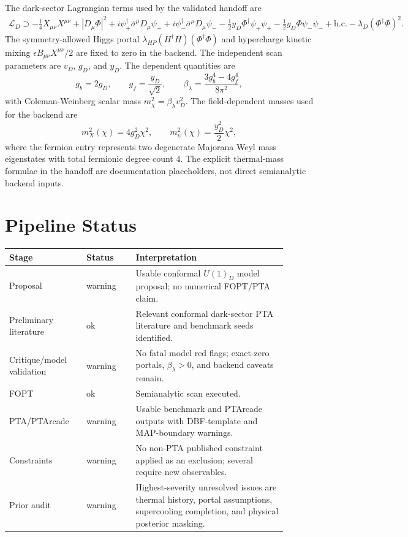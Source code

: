 \documentclass[11pt]{article}
\begin{document}
The dark-sector Lagrangian terms used by the validated handoff are
\begin{align}
\mathcal{L}_D \supset
-\frac14 X_{\mu\nu}X^{\mu\nu}
 + |D_\mu\Phi|^2
 + i\psi_+^\dagger\bar\sigma^\mu D_\mu\psi_+
 + i\psi_-^\dagger\bar\sigma^\mu D_\mu\psi_-
 -\frac12 y_D \Phi^\dagger \psi_+\psi_+
 -\frac12 y_D \Phi \psi_-\psi_- + \mathrm{h.c.}
 - \lambda_D(\Phi^\dagger\Phi)^2 .
\end{align}
The symmetry-allowed Higgs portal \(\lambda_{HP}(H^\dagger H)(\Phi^\dagger\Phi)\) and hypercharge kinetic mixing \(\epsilon B_{\mu\nu}X^{\mu\nu}/2\) are fixed to zero in the backend.  The independent scan parameters are \(v_D\), \(g_D\), and \(y_D\).  The dependent quantities are
\begin{equation}
g_b=2g_D,\qquad g_f=\frac{y_D}{\sqrt{2}},\qquad
\beta_\lambda=\frac{3g_b^4-4g_f^4}{8\pi^2},
\end{equation}
with Coleman-Weinberg scalar mass \(m_\chi^2=\beta_\lambda v_D^2\).  The field-dependent masses used for the backend are
\begin{equation}
m_X^2(\chi)=4g_D^2\chi^2,\qquad
m_\psi^2(\chi)=\frac{y_D^2}{2}\chi^2,
\end{equation}
where the fermion entry represents two degenerate Majorana Weyl mass eigenstates with total fermionic degree count \(4\).  The explicit thermal-mass formulae in the handoff are documentation placeholders, not direct semianalytic backend inputs.

\section{Pipeline Status}
\begin{center}
\begin{tabular}{p{0.25\linewidth}p{0.16\linewidth}p{0.49\linewidth}}
\toprule
Stage & Status & Interpretation \\
\midrule
Proposal & warning & Usable conformal \(U(1)_D\) model proposal; no numerical FOPT/PTA claim. \\
Preliminary literature & ok & Relevant conformal dark-sector PTA literature and benchmark seeds identified. \\
Critique/model validation & warning & No fatal model red flags; exact-zero portals, \(\beta_\lambda>0\), and backend caveats remain. \\
FOPT & ok & Semianalytic scan executed. \\
PTA/PTArcade & warning & Usable benchmark and PTArcade outputs with DBF-template and MAP-boundary warnings. \\
Constraints & warning & No non-PTA published constraint applied as an exclusion; several require new observables. \\
Prior audit & warning & Highest-severity unresolved issues are thermal history, portal assumptions, supercooling completion, and physical posterior masking. \\
\bottomrule
\end{tabular}
\end{center}
\end{document}
